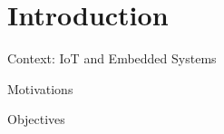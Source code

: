 \section{Introduction}

\begin{frame}{Context: IoT and Embedded Systems}
    
\end{frame}

\begin{frame}{Motivations}
    
\end{frame}
\begin{frame}{Objectives}
    
\end{frame}
